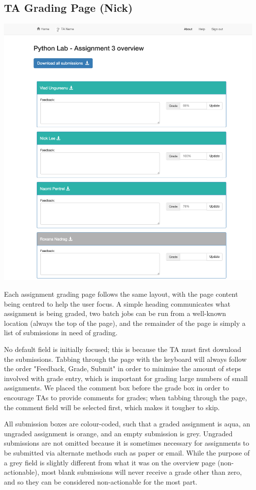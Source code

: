 \subsection{TA Grading Page (Nick)}

\includegraphics[width=\textwidth]{screenshots/GradingAssignmentOverview.png}

Each assignment grading page follows the same layout, with the page content being centred to help the user focus. A simple heading communicates what assignment is being graded, two batch jobs can be run from a well-known location (always the top of the page), and the remainder of the page is simply a list of submissions in need of grading. 

No default field is initially focused; this is because the TA must first download the submissions. Tabbing through the page with the keyboard will always follow the order "Feedback, Grade, Submit" in order to minimise the amount of steps involved with grade entry, which is important for grading large numbers of small assignments. We placed the comment box before the grade box in order to encourage TAs to provide comments for grades; when tabbing through the page, the comment field will be selected first, which makes it tougher to skip.

All submission boxes are colour-coded, such that a graded assignment is aqua, an ungraded assignment is orange, and an empty submission is grey. Ungraded submissions are not omitted because it is sometimes necessary for assignments to be submitted via alternate methods such as paper or email. While the purpose of a grey field is slightly different from what it was on the overview page (non-actionable), most blank submissions will never receive a grade other than zero, and so they can be considered non-actionable for the most part. 

